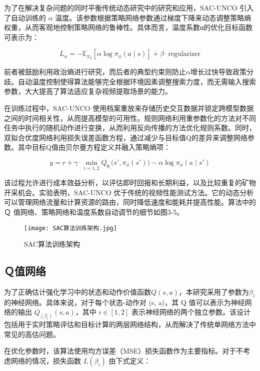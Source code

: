 为了在解决复杂问题的同时平衡传统动态研究中的研究和应用，SAC-UNCO 引入了自动训练的 \(α\) 温度。该参数根据策略网络参数通过梯度下降来动态调整策略熵权重，从而客观地控制策略网络的鲁棒性。具体而言，温度系数α的优化目标函数可表示为：

\begin{equation}
	L_{\alpha} = -\mathbb{E}_{\pi_{\phi}} \left[ \alpha \log \pi_{\phi}(a \mid s) \right] + \beta \cdot \text{regularizer}
\end{equation}

前者被鼓励利用政治熵进行研究，而后者的典型约束则防止\(α\)增长过快导致政策分歧。自动温度控制使得算法能够完全根据环境因素调整搜索力度，而无需输入搜索参数，大大提高了算法适应复杂视频提取场景的能力。

在训练过程中，SAC-UNCO 使用档案重放来存储历史交互数据并锁定跨模型数据之间的时间相关性，从而提高模型的可用性。规则网络利用重参数化的方法对不同任务中执行的随机动作进行变换，从而利用反向传播的方法优化规则系数。同时，双拟合优度网络利用损失误差函数方程，通过减少与目标值Q的差异来调整网络参数。其中目标Q值由贝尔曼方程定义并融入策略熵项：

\begin{equation}
	y = r + \gamma \cdot \min_{i=1,2} Q_{\theta_i}\big(s', \pi_\phi(s')\big) - \alpha \log \pi_\phi(a \mid s')
\end{equation}

该过程允许进行成本效益分析，以评估即时回报和长期利益，以及比较重复的矿物开采机会。实验表明，SAC-UNCO 优于传统的视频性能测试方法。它的动态分析可以管理网络流量和计算资源的路由，同时降低速度和能耗并提高性能。算法中的 Ｑ 值网络、策略网络和温度系数自动调节的细节如图3-5。

\begin{figure}[hbt]
	\centering
	\texttt{[image: SAC算法训练架构.jpg]}
	\caption{SAC算法训练架构}
	\label{f.example}
\end{figure}


\subsection{Ｑ值网络}

为了正确估计强化学习中的状态和动作价值函数\(Q(s,a)\)，本研究采用了参数为\(β_i\)的神经网络。具体来说，对于每个状态-动作对 (s, a)，其 Q 值可以表示为神经网络的输出 \(Q_(β_i)(s, a)\)，其中 \(i∈[1,2]\) 表示神经网络的两个独立参数。该设计包括用于实时策略评估和目标计算的两层网络结构，从而解决了传统单网络方法中常见的高估问题。

在优化参数时，该算法使用均方误差（MSE）损失函数作为主要指标。对于不考虑网络的情况，损失函数 \(L(β_i)\) 由下式定义：

